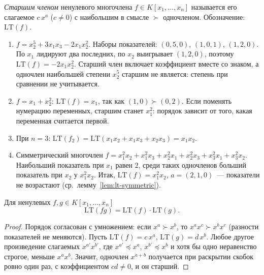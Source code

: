 \documentclass[12pt]{article}
\begin{document}
    \begin{definition}\label{def:leading-term}
    	\emph{Старшим членом} ненулевого многочлена $f \in K[x_1, \dots, x_n]$ называется его слагаемое $c\,x^a$ ($c \ne 0$) с наибольшим в смысле $\succ$ одночленом. Обозначение: $\mathrm{LT}(f)$.
    \end{definition}

	\begin{example}
    	\begin{enumerate}
    		\item $f = x_2^5 + 3x_1 x_3 - 2x_1 x_2^2$. Наборы показателей: $(0, 5, 0)$, $(1, 0, 1)$, $(1, 2, 0)$. По $x_1$ лидируют два последних, по $x_2$ выигрывает $(1, 2, 0)$, поэтому $\mathrm{LT}(f) = -2x_1 x_2^2$. Старший член включает коэффициент вместе со знаком, а одночлен наибольшей степени $x_2^5$ старшим не является: степень при сравнении не учитывается.
    		\item $f = x_1 + x_2^2$: $\mathrm{LT}(f) = x_1$, так как $(1, 0) \succ (0, 2)$. Если поменять нумерацию переменных, старшим станет $x_1^2$: порядок зависит от того, какая переменная считается первой.
    		\item При $n = 3$: $\mathrm{LT}(f_2) = \mathrm{LT}(x_1 x_2 + x_1 x_3 + x_2 x_3) = x_1 x_2$.
    		\item Симметрический многочлен $f = x_1^2 x_2 + x_1^2 x_3 + x_2^2 x_1 + x_2^2 x_3 + x_3^2 x_1 + x_3^2 x_2$. Наибольший показатель при $x_1$ равен $2$, среди таких одночленов больший показатель при $x_2$ у $x_1^2 x_2$. Итак, $\mathrm{LT}(f) = x_1^2 x_2$, $a = (2, 1, 0)$~--- показатели не возрастают (ср.\ лемму~\ref{lem:lt-symmetric}).
    	\end{enumerate}
    \end{example}

    \begin{lemma}\label{lem:lt-product}
    	Для ненулевых $f, g \in K[x_1, \dots, x_n]$
    	\[
    		\mathrm{LT}(fg) = \mathrm{LT}(f) \cdot \mathrm{LT}(g).
    	\]
    \end{lemma}

    \begin{proof}
    	Порядок согласован с умножением: если $x^a \succ x^b$, то $x^a x^c \succ x^b x^c$ (разности показателей не меняются). Пусть $\mathrm{LT}(f) = c\,x^a$, $\mathrm{LT}(g) = d\,x^b$. Любое другое произведение слагаемых $x^{a'} x^{b'}$, где $x^{a'} \preceq x^a$, $x^{b'} \preceq x^b$ и хотя бы одно неравенство строгое, меньше $x^a x^b$. Значит, одночлен $x^{a+b}$ получается при раскрытии скобок ровно один раз, с коэффициентом $cd \ne 0$, и он старший.
    \end{proof}
\end{document}
